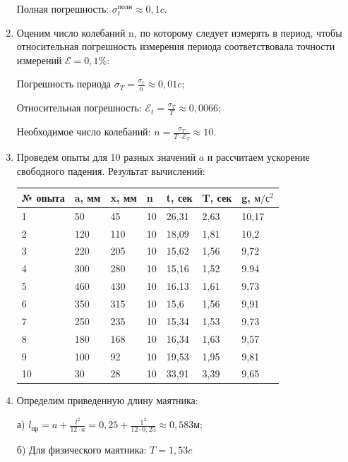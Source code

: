 \documentclass[a4paper,12pt]{article} %
\begin{document}
\begin{enumerate}
Полная погрешность: $\sigma^{полн}_{t}\approx 0,1c$.
\item Оценим число колебаний n, по которому следует измерять в период, чтобы относительная погрешность измерения периода соответствовала точности измерений $\mathcal{E} = 0,1\%$:

 Погрешность периода $\sigma_T = \frac{\sigma_t}{n}\approx 0,01c$;

 Относительная погрешность: $\mathcal{E}_t=\frac{\sigma_T}{T}\approx 0,0066$;

 Необходимое число колебаний: $n=\frac{\sigma_T}{T\cdot \mathcal{E}_T}\approx 10$.

\item Проведем опыты для 10 разных значений $a$ и рассчитаем ускорение свободного падения. Результат вычислений:

    \begin{tabular}{l|l|l|l|l|l|l}
    № опыта & a, мм & x, мм & n  & t, сек & T, сек & g, $м/с^2$ \\ \hline
    1       & 50    & 45    & 10 & 26,31  & 2,63   & 10,17         \\ \hline
    2       & 120   & 110   & 10 & 18,09  & 1,81   & 10,2          \\ \hline
    3       & 220   & 205   & 10 & 15,62  & 1,56   & 9,72          \\ \hline
    4       & 300   & 280   & 10 & 15,16  & 1,52   & 9.94          \\ \hline
    5       & 460   & 430   & 10 & 16,13  & 1,61   & 9,73          \\ \hline
    6       & 350   & 315   & 10 & 15,6   & 1,56   & 9,91          \\ \hline
    7       & 250   & 235   & 10 & 15,34  & 1,53   & 9,73          \\ \hline
    8       & 180   & 168   & 10 & 16,34  & 1,63   & 9,57          \\ \hline
    9       & 100   & 92    & 10 & 19,53  & 1,95   & 9,81          \\ \hline
    10      & 30    & 28    & 10 & 33,91  & 3,39   & 9,65          \\
    \end{tabular}


\item Определим приведенную длину маятника:

а) $l_{пр}=a+\frac{l^2}{12\cdot a}=0,25+\frac{1^2}{12\cdot 0,25}\approx 0,583м$;

б) Для физического маятника: $T = 1,53c$


\end{enumerate}
\end{document}
